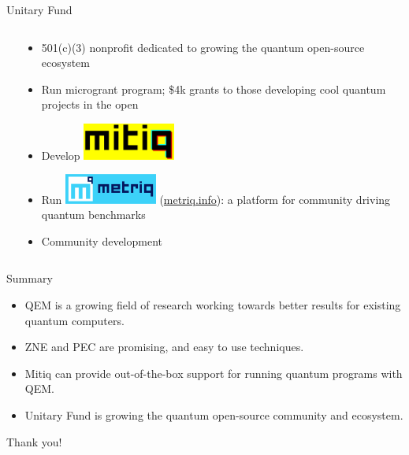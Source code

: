\documentclass[11pt,aspectratio=1610,xcolor=dvipsnames]{beamer}
\begin{document}
\begin{frame}{Unitary Fund}
\begin{columns}
\begin{column}{0.5\textwidth}
		\end{column}
		\begin{column}{0.5\textwidth}
			\begin{itemize}[<+->]
				\item 501(c)(3) nonprofit dedicated to growing the quantum open-source ecosystem
				\item \alert<2>{Run microgrant program; \$4k grants to those developing cool quantum projects in the open}
				\item Develop \includegraphics[width=0.25\textwidth]{mitiq-logo.png}
				\item \alert<4>{Run \includegraphics[width=0.25\textwidth]{metriq-logo.png} (\url{metriq.info}): a platform for community driving quantum benchmarks}
				\item \alert<5>{Community development}
			\end{itemize}
		\end{column}
	\end{columns}
\end{frame}


\begin{frame}{Summary}
	\begin{itemize}
		\item QEM is a growing field of research working towards better results for existing quantum computers.
		\item ZNE and PEC are promising, and easy to use techniques.
		\item Mitiq can provide out-of-the-box support for running quantum programs with QEM.
		\item Unitary Fund is growing the quantum open-source community and ecosystem.
	\end{itemize}
\end{frame}


\begin{frame}[standout]
	Thank you!
\end{frame}
\end{document}

